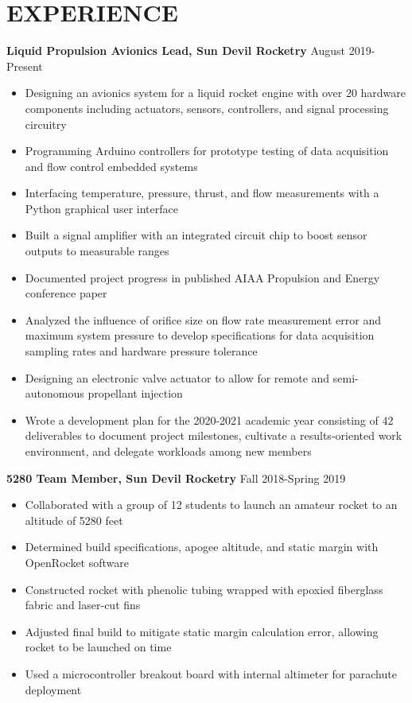 \documentclass{article}
\begin{document}
\section{EXPERIENCE}
\textbf{Liquid Propulsion Avionics Lead, Sun Devil Rocketry}
\hfill
\vspace{0.5em}
August 2019-Present
\begin{itemize}
	\item{Designing an avionics system for a liquid rocket engine with over 20 hardware components including actuators, sensors, controllers, and signal processing circuitry}
	\item{Programming Arduino controllers for prototype testing of data acquisition and flow control embedded systems}
	\item{Interfacing temperature, pressure, thrust, and flow measurements with a Python graphical user interface}
	\item{Built a signal amplifier with an integrated circuit chip to boost sensor outputs to measurable ranges}
	\item{Documented project progress in published AIAA Propulsion and Energy conference paper}
	\item{Analyzed the influence of orifice size on flow rate measurement error and maximum system pressure to develop specifications for data acquisition sampling rates and hardware pressure tolerance}
	\item{Designing an electronic valve actuator to allow for remote and semi-autonomous propellant injection}
	\item{Wrote a development plan for the 2020-2021 academic year consisting of 42 deliverables to document project milestones, cultivate a results-oriented work environment, and delegate workloads among new members}	
\end{itemize}
\vspace{1em}
\textbf{5280 Team Member, Sun Devil Rocketry}
\hfill Fall 2018-Spring 2019
\vspace{0.5em}
\begin{itemize}
	\item Collaborated with a group of 12 students to launch an amateur rocket to an altitude of 5280 feet
	\item Determined build specifications, apogee altitude, and static margin with OpenRocket software
	\item Constructed rocket with phenolic tubing wrapped with epoxied fiberglass fabric and laser-cut fins 
	\item Adjusted final build to mitigate static margin calculation error, allowing rocket to be launched on time
	\item Used a microcontroller breakout board with internal altimeter for parachute deployment
\end{itemize}
\end{document}
